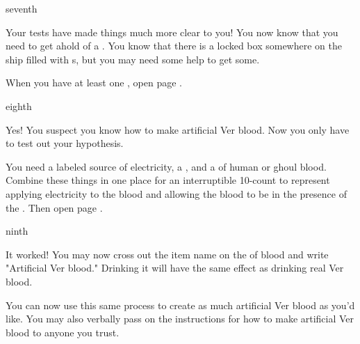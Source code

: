 \documentclass[greennotebook]{guildcamp4} %
\begin{document}
\begin{page}{seventh}

Your tests have made things much more clear to you! You now know that you need to get ahold of a \iIsotope{}. You know that there is a locked box somewhere on the ship filled with \iIsotope{}s, but you may need some help to get some.

When you have at least one \iIsotope{}, open page .

\end{page}

\begin{page}{eighth}

Yes! You suspect you know how to make artificial Ver blood. Now you only have to test out your hypothesis.

You need a labeled source of electricity, a \iIsotope{}, and a \iTestTube{} of human or ghoul blood. Combine these things in one place for an interruptible 10-count to represent applying electricity to the blood and allowing the blood to be in the presence of the \iIsotope{}. Then open page .

\end{page}

\begin{page}{ninth}

It worked! You may now cross out the item name on the \iTestTube{} of blood and write "Artificial Ver blood." Drinking it will have the same effect as drinking real Ver blood.

You can now use this same process to create as much artificial Ver blood as you'd like. You may also verbally pass on the instructions for how to make artificial Ver blood to anyone you trust.

\end{page}

\endnotebook
\end{document}
